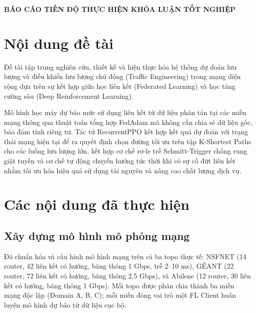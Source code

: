 \documentclass[11pt,a4paper]{article}
\begin{document}

\begin{center}
    {\Large\bfseries BÁO CÁO TIẾN ĐỘ THỰC HIỆN KHÓA LUẬN TỐT NGHIỆP}
\end{center}

\vspace{0.4cm}

\section{Nội dung đề tài}

Đề tài tập trung nghiên cứu, thiết kế và hiện thực hóa hệ thống dự đoán lưu lượng và điều khiển lưu lượng chủ động (Traffic Engineering) trong mạng diện rộng dựa trên sự kết hợp giữa học liên kết (Federated Learning) và học tăng cường sâu (Deep Reinforcement Learning).

Mô hình học máy dự báo mức sử dụng liên kết từ dữ liệu phân tán tại các miền mạng thông qua thuật toán tổng hợp FedAdam mà không cần chia sẻ dữ liệu gốc, bảo đảm tính riêng tư. Tác tử RecurrentPPO kết hợp kết quả dự đoán với trạng thái mạng hiện tại để ra quyết định chọn đường tối ưu trên tập K-Shortest Paths cho các luồng lưu lượng lớn, kết hợp cơ chế rơ-le trễ Schmitt-Trigger chống rung giật tuyến và cơ chế tự động chuyển hướng tức thời khi có sự cố đứt liên kết nhằm tối ưu hóa hiệu quả sử dụng tài nguyên và nâng cao chất lượng dịch vụ.

\section{Các nội dung đã thực hiện}

\subsection{Xây dựng mô hình mô phỏng mạng}
Đã chuẩn hóa và cấu hình mô hình mạng trên cả ba topo thực tế: NSFNET (14 router, 42 liên kết có hướng, băng thông 1 Gbps, trễ 2–10 ms), GÉANT (22 router, 72 liên kết có hướng, băng thông 2.5 Gbps), và Abilene (12 router, 30 liên kết có hướng, băng thông 1 Gbps). Mỗi topo được phân chia thành ba miền mạng độc lập (Domain A, B, C); mỗi miền đóng vai trò một FL Client huấn luyện mô hình dự báo từ dữ liệu cục bộ.
\end{document}

